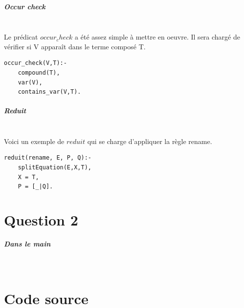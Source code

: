 \documentclass[10pt,a4paper]{report}
\begin{document}
\paragraph{Occur check} ~\\
Le prédicat $occur_check$ a été assez simple à mettre en oeuvre. Il sera chargé de vérifier si V apparaît dans le terme composé T.
\begin{lstlisting}[caption ={Dans le fichier $main.pl$}]
occur_check(V,T):-
	compound(T),
	var(V),
	contains_var(V,T).
\end{lstlisting}

\paragraph{Reduit} ~\\
Voici un exemple de $reduit$ qui se charge d'appliquer la règle rename.
\begin{lstlisting}[caption ={reduit dans $main.pl$}]
reduit(rename, E, P, Q):-
	splitEquation(E,X,T),
	X = T,
	P = [_|Q].
\end{lstlisting}





\chapter*{Question 2}
\paragraph{Dans le main} ~\\





\mbox{}
\newpage
\chapter*{Code source}
\end{document}

